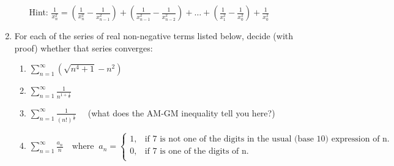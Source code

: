 \documentclass[11pt]{article}
\begin{document}
\begin{enumerate}[leftmargin=0pt, label=\arabic*)]
\begin{enumerate}[label=(\roman*)]
         Hint: \(\frac{1}{x_n^2} = \left(\frac{1}{x_n^2} - \frac{1}{x_{n-1}^2}\right) + \left(\frac{1}{x_{n-1}^2} - 
         \frac{1}{x_{n-2}^2}\right) + \dots + \left(\frac{1}{x_1^2} - \frac{1}{x_0^2}\right) + \frac{1}{x_0^2}\)
     \end{enumerate}
     \newpage
     
   \item For each of the series of real non-negative terms listed below, decide (with proof) whether that series converges:
     \begin{enumerate}[label=(\roman*)]
     \item \(\displaystyle\sum_{n=1}^{\infty} \left(\sqrt{n^4 + 1} - n^2\right)\)

     \item \(\displaystyle\sum_{n=1}^{\infty} \frac{1}{n^{1+\frac{1}{n}}}\)

     \item \(\displaystyle\sum_{n=1}^{\infty} \frac{1}{(n!)^{\frac{1}{n}}} \quad\) (what does the AM-GM inequality tell you here?)

     \item \(\displaystyle\sum_{n=1}^{\infty} \frac{a_n}{n} \quad \text{where} \;\; a_n = \begin{cases}
       1, & \text{if 7 is not one of the digits in the usual (base 10) expression of n.} \\
       0, & \text{if 7 is one of the digits of n.} \\
     \end{cases}\)
   \end{enumerate}
 \end{enumerate}
\end{document}
